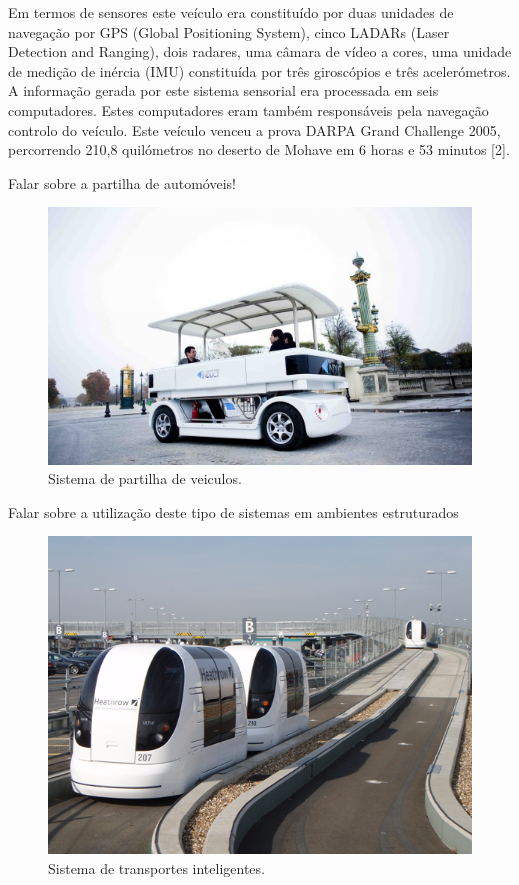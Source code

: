 \documentclass[a4paper,10pt]{texRel}
\begin{document}
Em termos de sensores este veículo era constituído por duas unidades de navegação por GPS (Global Positioning System), cinco LADARs (Laser Detection and Ranging), dois radares, uma câmara de vídeo a cores, uma unidade de medição de inércia (IMU) constituída por três giroscópios e três acelerómetros. A informação gerada por este sistema sensorial era processada em seis computadores. Estes computadores eram também responsáveis pela navegação controlo do veículo. Este veículo venceu a prova DARPA Grand Challenge 2005, percorrendo 210,8 quilómetros no deserto de Mohave em 6 horas e 53 minutos [2].

Falar sobre a partilha de automóveis!
\begin{figure}[H]
\centering
\includegraphics{future1.png}
\caption{Sistema de partilha de veiculos.}
\label{fig_futuro1}
\end{figure}

Falar sobre a utilização deste tipo de sistemas em ambientes estruturados
\begin{figure}[H]
\centering
\includegraphics{future2.png}
\caption{Sistema de transportes inteligentes.}
\label{fig_futuro2}
\end{figure}
\end{document}
